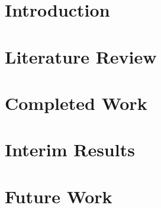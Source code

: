 \documentclass[a4paper,11pt,twoside]{report}
\author{\me}
\begin{document}


\normalsize

%

\begingroup
    \singlespacing
    \tableofcontents
\endgroup

\linespread{2}
\chapter{Introduction}\label{chapter:Introduction}
\setcounter{page}{0}


\chapter{Literature Review}\label{chapter:Literature Review}


\begingroup
\renewcommand{\cleardoublepage}{}
\renewcommand{\clearpage}{}
\vspace{33pt}
\chapter{Completed Work}\label{chapter:Completed Work}
\endgroup


\chapter{Interim Results}\label{chapter:Interim Results}


\chapter{Future Work}\label{chapter:Future Work}


%

\begingroup
    \singlespacing
    
    
\endgroup
\end{document}
